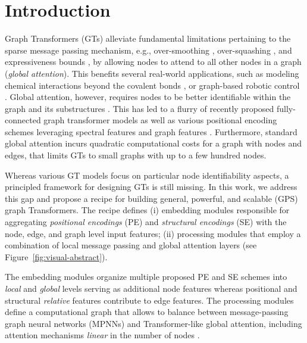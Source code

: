 \documentclass{article}
\begin{document}
\section{Introduction}


Graph Transformers (GTs) alleviate fundamental limitations pertaining to the sparse message passing mechanism, e.g., over-smoothing \cite{Oono2020Graph}, over-squashing \cite{alon2021on}, and expressiveness bounds \cite{xu2018how, morris2019}, by allowing nodes to attend to all other nodes in a graph (\emph{global attention}).
This benefits several real-world applications, such as modeling chemical interactions beyond the covalent bonds \cite{ying2021graphormer}, or graph-based robotic control \cite{kurin2020my_body}.
Global attention, however, requires  nodes to be better identifiable within the graph and its substructures \cite{dwivedi2020generalization}. 
This has led to a flurry of recently proposed fully-connected graph transformer models \cite{dwivedi2020generalization,kreuzer2021rethinking,ying2021graphormer,mialon2021graphit,jain2021graphtrans} as well as various positional encoding schemes leveraging spectral features \cite{dwivedi2020generalization,kreuzer2021rethinking,lim2022sign} and graph features \cite{dwivedi2022LPE,chen2022SAT}.
Furthermore, standard global attention incurs quadratic computational costs  for a graph with  nodes and  edges, that limits GTs to small graphs with up to a few hundred nodes.

Whereas various GT models focus on particular node identifiability aspects, a principled framework for designing GTs is still missing. 
In this work, we address this gap and propose a recipe for building general, powerful, and scalable (GPS) graph Transformers.
The recipe defines (i) embedding modules responsible for aggregating \emph{positional encodings} (PE) and \emph{structural encodings} (SE) with the node, edge, and graph level input features;
(ii) processing modules that employ a combination of local message passing and global attention layers (see Figure~\ref{fig:visual-abstract}).

The embedding modules organize multiple proposed PE and SE schemes into \emph{local} and \emph{global} levels serving as additional node features whereas positional and structural \emph{relative} features contribute to edge features. 
The processing modules define a computational graph that allows to balance between message-passing graph neural networks (MPNNs) and Transformer-like global attention, including attention mechanisms \emph{linear} in the number of nodes . 
\end{document}

